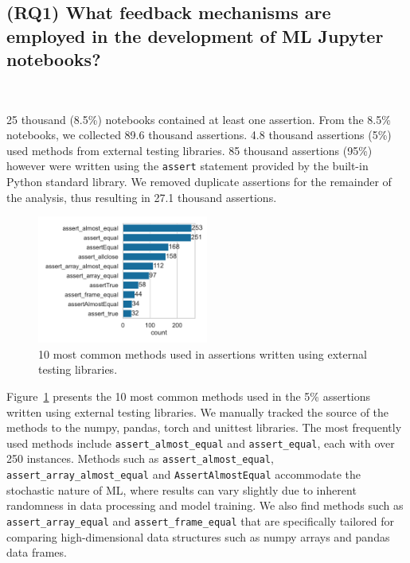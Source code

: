 \subsection{(RQ1) What feedback mechanisms are employed in the development of ML Jupyter notebooks?}~\label{sec:result-analysis}

25 thousand (8.5\%) notebooks contained at least one assertion. From the 8.5\% notebooks, we collected 89.6 thousand assertions. 4.8 thousand assertions (5\%) used methods from external testing libraries. 85 thousand assertions (95\%) however were written using the \lstinline{assert} statement provided by the built-in Python standard library. We removed duplicate assertions for the remainder of the analysis, thus resulting in 27.1 thousand assertions.

\begin{figure}
  \centering
  \includegraphics[width=0.5\textwidth]{other-test-methods.pdf}
  \caption{10 most common methods used in assertions written using external testing libraries.}
  \label{fig:other-test-methods}
\end{figure}

Figure~\ref{fig:other-test-methods} presents the 10 most common methods used in the 5\% assertions written using external testing libraries. We manually tracked the source of the methods to the numpy, pandas, torch and unittest libraries. The most frequently used methods include \lstinline{assert_almost_equal} and \lstinline{assert_equal}, each with over 250 instances. Methods such as \lstinline{assert_almost_equal}, \lstinline{assert_array_almost_equal} and \lstinline{AssertAlmostEqual} accommodate the stochastic nature of ML, where results can vary slightly due to inherent randomness in data processing and model training. We also find methods such as \lstinline{assert_array_equal} and \lstinline{assert_frame_equal} that are specifically tailored for comparing high-dimensional data structures such as numpy arrays and pandas data frames.

